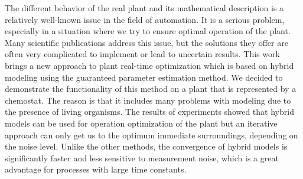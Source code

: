 The different behavior of the real plant and its mathematical description is a relatively well-known issue in the field of automation. It is a serious problem, especially in a situation where we try to ensure optimal operation of the plant. Many scientific publications address this issue, but the solutions they offer are often very complicated to implement or lead to uncertain results. This work brings a new approach to plant real-time optimization which is based on hybrid modeling using the guaranteed parameter estimation method. We decided to demonstrate the functionality of this method on a plant that is represented by a chemostat. The reason is that it includes many problems with modeling due to the presence of living organisms. The results of experiments showed that hybrid models can be used for operation optimization of the plant but an iterative approach can only get us to the optimum immediate surroundings, depending on the noise level. Unlike the other methods, the convergence of hybrid models is significantly faster and less sensitive to measurement noise, which is a great advantage for processes with large time constants.

